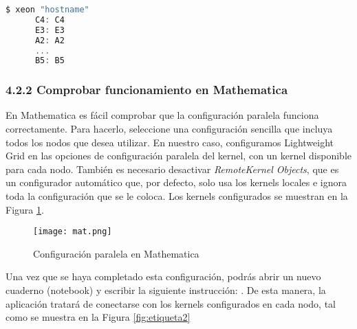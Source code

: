 \begin{spacing}{1.5}

  \begin{lstlisting}[language=C]
      $ xeon "hostname"
      C4: C4
      E3: E3
      A2: A2
      ...
      B5: B5
  \end{lstlisting}

  \subsubsection {4.2.2 Comprobar funcionamiento en Mathematica}

  En Mathematica es fácil comprobar que la configuración paralela funciona
  correctamente. Para hacerlo, seleccione una configuración sencilla que
  incluya
  todos los nodos que desea utilizar. En nuestro caso, configuramos Lightweight
  Grid en las opciones de configuración paralela del kernel, con un kernel
  disponible para cada nodo. También es necesario desactivar
  \textit{RemoteKernel
    Objects}, que es un configurador automático que, por defecto, solo usa los
  kernels locales e ignora toda la configuración que se le coloca. Los kernels
  configurados se muestran en la Figura \ref{fig:etiqueta1}.  \newline  \newline

  \begin{figure}[h]
    \centering
    \texttt{[image: mat.png]}
    \caption{Configuración paralela en Mathematica}
    \label{fig:etiqueta1}
  \end{figure}

  Una vez que se haya completado esta configuración, podrás abrir un nuevo
  cuaderno (notebook) y escribir la siguiente instrucción: . De esta manera, la aplicación tratará de conectarse con los kernels
  configurados en cada nodo, tal como se muestra en la Figura
  \ref{fig:etiqueta2}


\end{spacing}

